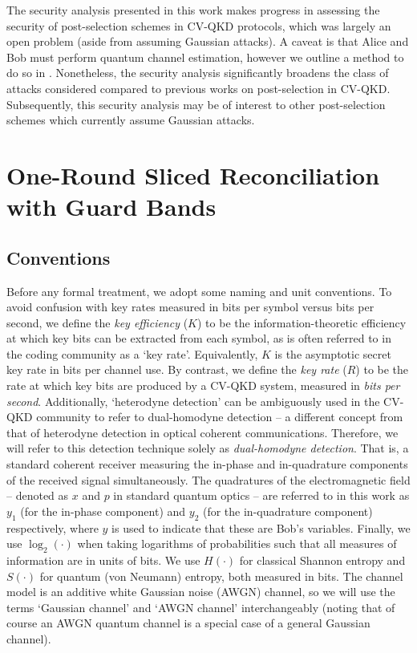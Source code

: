 ﻿\documentclass[12pt]{article}
\begin{document}
The security analysis presented in this work makes progress in assessing the security of post-selection schemes in CV-QKD protocols, which was largely an open problem (aside from assuming Gaussian attacks). A caveat is that Alice and Bob must perform quantum channel estimation, however we outline a method to do so in . Nonetheless, the security analysis significantly broadens the class of attacks considered compared to previous works on post-selection in CV-QKD. Subsequently, this security analysis may be of interest to other post-selection schemes which currently assume Gaussian attacks.

\section{One-Round Sliced Reconciliation with Guard Bands}\label{sec: one-round sliced reconciliation with guard bands}

\subsection{Conventions}\label{subsec: conventions}

Before any formal treatment, we adopt some naming and unit conventions. To avoid confusion with key rates measured in bits per symbol versus bits per second, we define the \textit{key efficiency} ($K$) to be the information-theoretic efficiency at which key bits can be extracted from each symbol, as is often referred to in the coding community as a `key rate'. Equivalently, $K$ is the asymptotic secret key rate in bits per channel use. By contrast, we define the \textit{key rate} ($R$) to be the rate at which key bits are produced by a CV-QKD system, measured in \textit{bits per second}. Additionally, `heterodyne detection' can be ambiguously used in the CV-QKD community to refer to dual-homodyne detection -- a different concept from that of heterodyne detection in optical coherent communications. Therefore, we will refer to this detection technique solely as \textit{dual-homodyne detection}. That is, a standard coherent receiver measuring the in-phase and in-quadrature components of the received signal simultaneously. The quadratures of the electromagnetic field -- denoted as $x$ and $p$ in standard quantum optics -- are referred to in this work as $y_1$ (for the in-phase component) and $y_2$ (for the in-quadrature component) respectively, where $y$ is used to indicate that these are Bob's variables. Finally, we use $\log_2(\cdot)$ when taking logarithms of probabilities such that all measures of information are in units of bits. We use $H(\cdot)$ for classical Shannon entropy and $S(\cdot)$ for quantum (von Neumann) entropy, both measured in bits. The channel model is an additive white Gaussian noise (AWGN) channel, so we will use the terms `Gaussian channel' and `AWGN channel' interchangeably (noting that of course an AWGN quantum channel is a special case of a general Gaussian channel).
\end{document}
